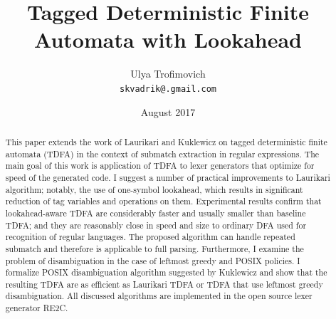 \documentclass{article}
\title{Tagged Deterministic Finite Automata with Lookahead}
\author{Ulya Trofimovich\\
\texttt{\small{skvadrik@.gmail.com}}}
\date{August 2017}
\theoremstyle{definition}
\begin{document}
\maketitle

\begin{abstract}
\noindent
This paper extends the work of Laurikari \cite{Lau00} \cite{Lau01}
and Kuklewicz \cite{Kuk07} on tagged deterministic finite automata (TDFA)
in the context of submatch extraction in regular expressions.
The main goal of this work is application of TDFA to lexer generators that optimize for speed of the generated code.
I suggest a number of practical improvements to Laurikari algorithm;
notably, the use of one-symbol lookahead, which results in significant reduction of tag variables and operations on them.
Experimental results confirm that lookahead-aware TDFA are considerably faster and usually smaller than baseline TDFA;
and they are reasonably close in speed and size to ordinary DFA used for recognition of regular languages.
The proposed algorithm can handle repeated submatch and therefore is applicable to full parsing.
Furthermore, I examine the problem of disambiguation in the case of leftmost greedy and POSIX policies.
I formalize POSIX disambiguation algorithm suggested by Kuklewicz
and show that the resulting TDFA are as efficient as Laurikari TDFA or TDFA that use leftmost greedy disambiguation.
All discussed algorithms are implemented in the open source lexer generator RE2C.
\end{abstract}
\vspace{1em}
\end{document}

